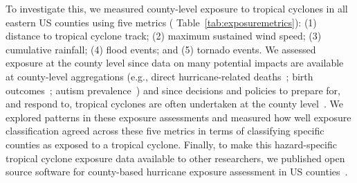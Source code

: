 To investigate this, we measured county-level exposure to tropical cyclones in
all eastern \ac{US} counties using five metrics (
Table~\ref{tab:exposuremetrics}): (1) distance to tropical cyclone track; (2) maximum
sustained wind speed; (3) cumulative rainfall; (4) flood events; and (5)
tornado events.  We assessed exposure at the county level since data on many
potential impacts are available at county-level aggregations (e.g., direct
hurricane-related deaths~\citep{czajkowski2011}; birth outcomes~\citep{grabich2015,
grabich2016}; autism prevalence~\citep{kinney2008}) and
since decisions and policies to prepare for, and respond to, tropical cyclones
are often undertaken at the county level~\citep{zandbergen2009, rappaport2000}.
We explored patterns in these exposure assessments and measured how well
exposure classification agreed across these five metrics in terms of
classifying specific counties as exposed to a tropical cyclone.  Finally, to
make this hazard-specific tropical cyclone exposure data available to other
researchers, we published open source software for county-based hurricane
exposure assessment in \ac{US} counties~\citep{hurricaneexposure}.
